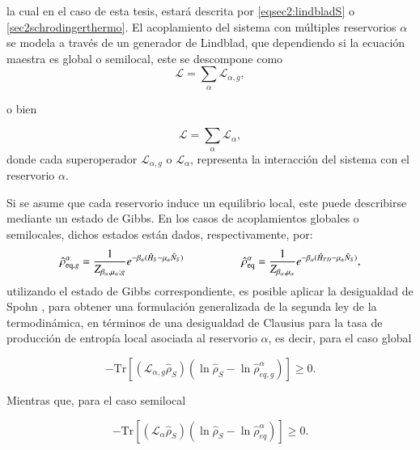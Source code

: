 la cual en el caso de esta tesis, estará descrita por \ref{eqsec2:lindbladS} o \ref{sec2schrodingerthermo}. El acoplamiento del sistema con múltiples reservorios $\alpha$ se modela a través de un generador de Lindblad, que dependiendo si la ecuación maestra es global o semilocal, este se descompone como
\begin{equation*}
    \mathcal{L} = \sum_{\alpha} \mathcal{L}_{\alpha,g},
\end{equation*}

o bien

\begin{equation*}
     \mathcal{L} = \sum_{\alpha} \mathcal{L}_{\alpha},
\end{equation*}
donde cada superoperador $\mathcal{L}_{\alpha,g}$ o $\mathcal{L}_{\alpha}$, representa la interacción del sistema con el reservorio $\alpha$. 



Si se asume que cada reservorio induce un equilibrio local, este puede describirse mediante un estado de Gibbs. En los casos de acoplamientos globales o semilocales, dichos estados están dados, respectivamente, por:
\begin{equation*}
    \hat{\rho}_{\text{eq},g}^{\alpha} = \frac{1}{Z_{\beta_\alpha, \mu_\alpha;g}} e^{-\beta_\alpha (\hat{H}_S - \mu_\alpha \hat{N}_{S})} \hspace{18mm}  \hat{\rho}_{\text{eq}}^{\alpha} = \frac{1}{Z_{\beta_\alpha, \mu_\alpha}} e^{-\beta_\alpha (\hat{H}_{TD} - \mu_\alpha \hat{N}_{S})}, 
\end{equation*}
utilizando el estado de Gibbs correspondiente, es posible aplicar la desigualdad de Spohn \cite{spohn1978entropy}, para obtener una formulación generalizada de la segunda ley de la termodinámica, en términos de una desigualdad de Clausius para la tasa de producción de entropía local asociada al reservorio $\alpha$, es decir, para el caso global

\begin{equation}
    - \text{Tr}[ (\mathcal{L}_{\alpha,g} \hat{\rho}_{S})(\ln \hat{\rho}_{S} - \ln \hat{\rho}^{\alpha}_{eq,g} )  ] \geq 0.
\label{spohninfo}
\end{equation}

Mientras que, para el caso semilocal

\begin{equation}
    - \text{Tr}[ (\mathcal{L}_{\alpha} \hat{\rho}_{S})(\ln \hat{\rho}_{S} - \ln \hat{\rho}^{\alpha}_{eq} )  ] \geq 0.
\label{spohninfolocal}
\end{equation}

